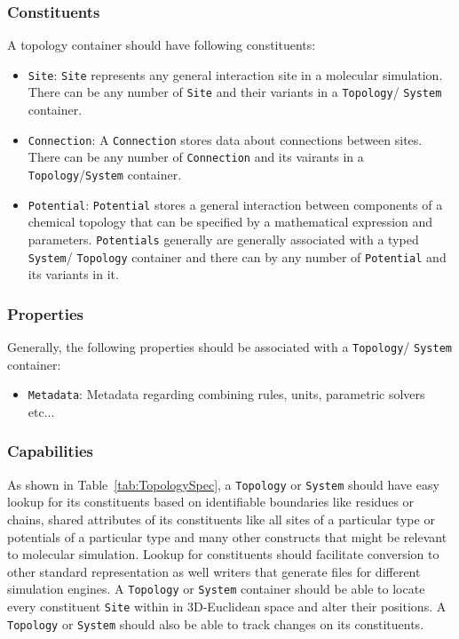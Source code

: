 \documentclass[12pt]{article}
\begin{document}
\subsubsection{Constituents}
A topology container should have following constituents:
\begin{itemize}
    \item \texttt{Site}: \texttt{Site} represents any general interaction site in a molecular simulation. There can be any number of \texttt{Site} and their variants in a \texttt{Topology}/ \texttt{System} container.

    \item \texttt{Connection}: A \texttt{Connection} stores data about connections between sites. There can be any number of \texttt{Connection} and its vairants in a \texttt{Topology}/\texttt{System} container.

    \item \texttt{Potential}: \texttt{Potential} stores a general interaction between components of a chemical topology that can be specified by a mathematical expression and parameters. \texttt{Potentials} generally are generally associated with a typed \texttt{System}/ \texttt{Topology} container and there can by any number of \texttt{Potential} and its variants in it.
\end{itemize}

\subsubsection{Properties}
Generally, the following properties should be associated with a \texttt{Topology}/ \texttt{System} container:

\begin{itemize}
    \item \texttt{Metadata}: Metadata regarding combining rules, units, parametric solvers etc...
\end{itemize}

\subsubsection{Capabilities}
As shown in Table~\ref{tab:TopologySpec}, a \texttt{Topology} or \texttt{System} should have easy lookup for its constituents based on identifiable boundaries like residues or chains, shared attributes of its constituents like all sites of a particular type or potentials of a particular type and many other constructs that might be relevant to molecular simulation. Lookup for constituents should facilitate conversion to other standard representation as well writers that generate files for different simulation engines. A \texttt{Topology} or \texttt{System} container should be able to locate every constituent \texttt{Site} within in 3D-Euclidean space and alter their positions. A \texttt{Topology} or \texttt{System} should also be able to track changes on its constituents.
\end{document}
